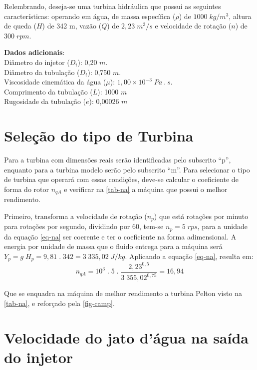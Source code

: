 
     Relembrando, deseja-se uma turbina hidráulica que possui as seguintes características: operando em água, de massa específica ($\rho$) de $1000\;kg/m^3$, altura de queda ($H$) de 342 m, vazão ($Q$) de $2,23\;m^3/s$ e velocidade de rotação ($n$) de $300\;rpm$.

    \noindent
    \textbf{Dados adicionais}: \\
    Diâmetro do injetor ($D_i$): 0,20 $m$. \\
    Diâmetro da tubulação ($D_t$): 0,750 $m$. \\
    Viscosidade cinemática da água ($\mu$): $1,00 \times 10^{-3}\; Pa\:.\:s$. \\
    Comprimento da tubulação ($L$): 1000 $m$ \\
    Rugosidade da tubulação ($e$): 0,00026 $m$


\section{Seleção do tipo de Turbina}

    Para a turbina com dimensões reais serão identificadas pelo subscrito ``p'', enquanto para a turbina modelo serão pelo subscrito ``m''. Para selecionar o tipo de turbina que operará com essas condições, deve-se calcular o coeficiente de forma do rotor $n_{qA}$ e verificar na \autoref{tab-na} a máquina que possui o melhor rendimento.


    Primeiro, transforma a velocidade de rotação ($n_p$) que está rotações por minuto para rotações por segundo, dividindo por 60, tem-se $n_p = 5\;rps$, para a unidade da equação \eqref{eq-na} ser coerente e ter o coeficiente na forma adimensional.
    A energia por unidade de massa que o fluido entrega para a máquina será $ Y_p = g \; H_p = 9,81 \; . \; 342 = 3\;335,02\;J/kg $. Aplicando a equação \eqref{eq-na}, resulta em:
    \begin{equation*}
        n_{qA} = 10^3 \; . \; 5 \; . \; \frac{2,23^{0,5}}{3\;355,02^{0,75}} = 16,94
    \end{equation*}

    Que se enquadra na máquina de melhor rendimento a turbina Pelton visto na \autoref{tab-na}, e reforçado pela \autoref{fig-camp}.


\section{Velocidade do jato d'água  na saída do injetor}

